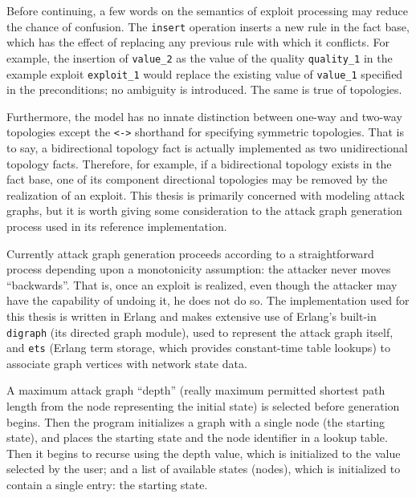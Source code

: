 Before continuing, a few words on the semantics of exploit processing may reduce
the chance of confusion. The \texttt{insert} operation inserts a new rule in the
fact base, which has the effect of replacing any previous rule with which it
conflicts. For example, the insertion of \texttt{value\_2} as the value of the quality
\texttt{quality\_1} in the example exploit \texttt{exploit\_1} would replace the
existing value of \texttt{value\_1} specified in the preconditions; no ambiguity
is introduced. The same is true of topologies.

Furthermore, the model has no innate distinction between one-way and two-way
topologies except the \texttt{<->} shorthand for specifying symmetric topologies.
That is to say, a bidirectional topology fact is actually implemented as
two unidirectional topology facts. Therefore, for example, if a bidirectional
topology exists in the fact base, one of its component directional topologies may
be removed by the realization of an exploit.
This thesis is primarily concerned with modeling attack graphs, but it is worth
giving some consideration to the attack graph generation process used in its
reference implementation.

Currently attack graph generation proceeds according to a straightforward process
depending upon a monotonicity assumption: the attacker never moves ``backwards''.
That is, once an exploit is realized, even though the attacker may have the capability
of undoing it, he does not do so. The implementation used for this thesis is written
in Erlang and makes extensive use of Erlang's built-in \texttt{digraph} (its directed 
graph module),
used to represent the attack graph itself, and \texttt{ets} (Erlang term storage, which
provides constant-time table lookups) to associate graph vertices with network state data.

A maximum attack graph ``depth'' (really maximum permitted shortest path length from the
node representing the initial state)
is selected before generation begins. Then the program initializes a graph with a single
node (the starting state), and places the starting state and the node identifier in a
lookup table. Then it begins to recurse using the depth value, which is initialized to
the value selected by the user; and a list of available 
states (nodes), which is initialized to contain a single entry: the starting state.

